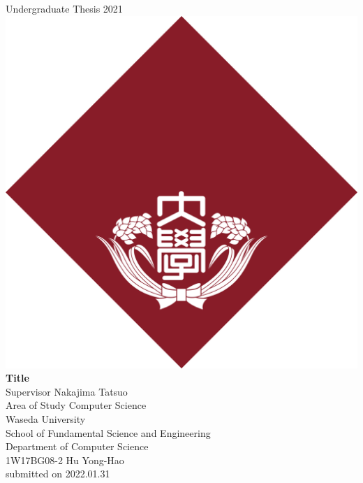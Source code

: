 \documentclass[a4paper, 12pt, oneside]{book}
\begin{document}

\begin{titlepage}
\begin{center}
    \vspace{0.1\textheight}
    {\Large Undergraduate Thesis 2021} \\
    \vspace{0.05\textheight}
    \includegraphics[width=48truemm]{resources/0_title/waseda_logo.png} \\
    \vspace{0.05\textheight}
    \textbf{\huge Title} \\
    \vfill
    {\Large Supervisor \hspace{0.02\textwidth} Nakajima Tatsuo} \\
    {\Large Area of Study \hspace{0.02\textwidth} Computer Science} \\
    \vspace{0.05\textheight}
    {\Large 
        Waseda University \\
        School of Fundamental Science and Engineering \\
        Department of Computer Science \\}
    \vspace{0.05\textheight}
    {\Large 1W17BG08-2 Hu Yong-Hao \\}
    \vspace{0.05\textheight}
    {submitted on 2022.01.31}
\end{center}
\end{titlepage}
\end{document}
